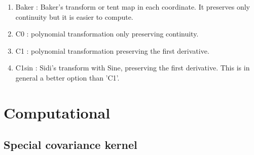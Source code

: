 \documentclass[10pt,compress,xcolor={usenames,dvipsnames}]{beamer} %
\begin{document}
\begin{enumerate}
\item Baker : Baker's transform or tent map in each coordinate. It preserves only continuity but it is easier to compute.
\item C0 : polynomial transformation only preserving continuity.
\item C1 : polynomial transformation preserving the first derivative.
\item C1sin : Sidi's transform with Sine, preserving the first derivative. This is in general a better option than 'C1'.
\end{enumerate}
\fi

































\section{Computational}


\subsection{Special covariance kernel }
\end{document}
